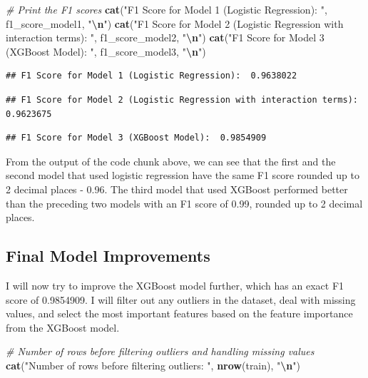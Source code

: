 \documentclass[
]{article}
\newenvironment{Shaded}{\begin{snugshade}}{\end{snugshade}}
\newcommand{\CommentTok}[1]{\textcolor[rgb]{0.56,0.35,0.01}{\textit{#1}}}
\newcommand{\FunctionTok}[1]{\textcolor[rgb]{0.13,0.29,0.53}{\textbf{#1}}}
\newcommand{\NormalTok}[1]{#1}
\newcommand{\SpecialCharTok}[1]{\textcolor[rgb]{0.81,0.36,0.00}{\textbf{#1}}}
\newcommand{\StringTok}[1]{\textcolor[rgb]{0.31,0.60,0.02}{#1}}
\begin{document}
\begin{Shaded}
\begin{Highlighting}[]
\CommentTok{\# Print the F1 scores}
\FunctionTok{cat}\NormalTok{(}\StringTok{"F1 Score for Model 1 (Logistic Regression): "}\NormalTok{, f1\_score\_model1, }\StringTok{"}\SpecialCharTok{\textbackslash{}n}\StringTok{"}\NormalTok{)}
\FunctionTok{cat}\NormalTok{(}\StringTok{"F1 Score for Model 2 (Logistic Regression with interaction terms): "}\NormalTok{, f1\_score\_model2, }\StringTok{"}\SpecialCharTok{\textbackslash{}n}\StringTok{"}\NormalTok{)}
\FunctionTok{cat}\NormalTok{(}\StringTok{"F1 Score for Model 3 (XGBoost Model): "}\NormalTok{, f1\_score\_model3, }\StringTok{"}\SpecialCharTok{\textbackslash{}n}\StringTok{"}\NormalTok{)}
\end{Highlighting}
\end{Shaded}

\begin{verbatim}
## F1 Score for Model 1 (Logistic Regression):  0.9638022
\end{verbatim}

\begin{verbatim}
## F1 Score for Model 2 (Logistic Regression with interaction terms):  0.9623675
\end{verbatim}

\begin{verbatim}
## F1 Score for Model 3 (XGBoost Model):  0.9854909
\end{verbatim}

From the output of the code chunk above, we can see that the first and
the second model that used logistic regression have the same F1 score
rounded up to 2 decimal places - 0.96. The third model that used XGBoost
performed better than the preceding two models with an F1 score of 0.99,
rounded up to 2 decimal places.

\subsection{Final Model Improvements}\label{final-model-improvements}

I will now try to improve the XGBoost model further, which has an exact
F1 score of 0.9854909. I will filter out any outliers in the dataset,
deal with missing values, and select the most important features based
on the feature importance from the XGBoost model.

\begin{Shaded}
\begin{Highlighting}[]
\CommentTok{\# Number of rows before filtering outliers and handling missing values}
\FunctionTok{cat}\NormalTok{(}\StringTok{"Number of rows before filtering outliers: "}\NormalTok{, }\FunctionTok{nrow}\NormalTok{(train), }\StringTok{"}\SpecialCharTok{\textbackslash{}n}\StringTok{"}\NormalTok{)}
\end{Highlighting}
\end{Shaded}
\end{document}
